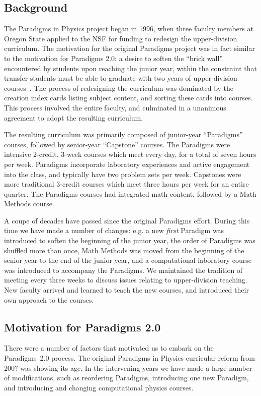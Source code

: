 \documentclass[english,aps,pra,reprint,noshowpacs,superscriptaddress]{revtex4-1}
\begin{document}
\subsection{Background}
The Paradigms in Physics project began in 1996, when three faculty
members at Oregon State applied to the NSF for funding to redesign the
upper-division curriculum.  The motivation for the original Paradigms
project was in fact similar to the motivation for Paradigms 2.0: a
desire to soften the ``brick wall'' encountered by students upon
reaching the junior year, within the constraint that transfer students
must be able to graduate with two years of upper-division
courses~\cite{manogue2001paradigms}.  The process of redesigning the
curriculum was dominated by the creation index cards listing subject
content, and sorting these cards into courses.  This process involved
the entire faculty, and culminated in a unanimous agreement to adopt
the resulting curriculum.

The resulting curriculum was primarily composed of junior-year
``Paradigms'' courses, followed by senior-year ``Capstone'' courses.
The Paradigms were intensive 2-credit, 3-week courses which meet every
day, for a total of seven hours per week.  Paradigms incorporate
laboratory experiences and active engagement into the class, and
typically have two problem sets per week.  Capstones were more
traditional 3-credit courses which meet three hours per week for an
entire quarter.  The Paradigms courses had integrated math content,
followed by a Math Methods course.

A coupe of decades have passed since the original Paradigms effort.
During this time we have made a number of changes: e.g. a new
\emph{first} Paradigm was introduced to soften the beginning of the
junior year, the order of Paradigms was shuffled more than once, Math
Methods was moved from the beginning of the senior year to the end of
the junior year, and a computational laboratory course was introduced
to accompany the Paradigms.  We maintained the tradition of meeting
every three weeks to discuss issues relating to upper-division
teaching.  New faculty arrived and learned to teach the new courses,
and introduced their own approach to the courses.

\subsection{Motivation for Paradigms 2.0}
There were a number of factors that motivated us to embark on the
Paradigms~2.0 process.  The original Paradigms in Physics curricular
reform from 200? was showing its age.  In the intervening years we
have made a large number of modifications, such as reordering
Paradigms, introducing one new Paradigm, and introducing and changing
computational physics courses.
\end{document}
